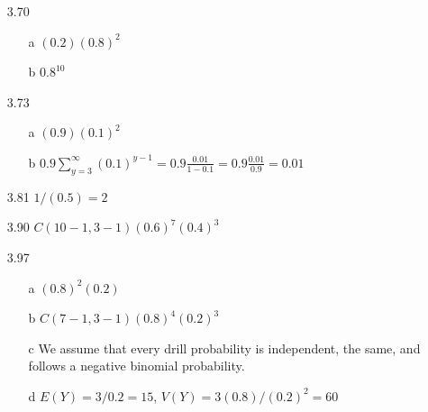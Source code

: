 \documentclass[11pt]{article}
\begin{document}
\begin{enumerate}
        \item[3.70]
        \begin{enumerate}
            \item[a] $(0.2)(0.8)^2$
            \item[b] $0.8^{10}$
        \end{enumerate}

        \item[3.73]
        \begin{enumerate}
            \item[a] $(0.9)(0.1)^2$
            \item[b] $0.9\sum_{y=3}^{\infty} (0.1)^{y - 1} = 0.9 \frac{0.01}{1 - 0.1} = 0.9 \frac{0.01}{0.9} = 0.01$
        \end{enumerate}

        \item[3.81] $1/(0.5) = 2$

        \item[3.90] $C(10 - 1, 3 - 1)(0.6)^7(0.4)^3$

        \item[3.97]
        \begin{enumerate}
            \item[a] $(0.8)^2(0.2)$
            \item[b] $C(7 - 1, 3 - 1)(0.8)^{4}(0.2)^3$
            \item[c] We assume that every drill probability is independent, the same, and follows a negative binomial probability.
            \item[d] $E(Y) = 3/0.2 = 15$, $V(Y) = 3(0.8)/(0.2)^2 = 60$
        \end{enumerate}

    \end{enumerate}
\end{document}
